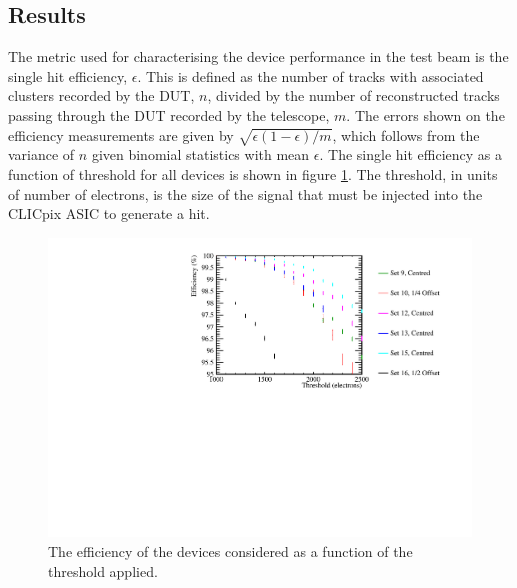 
\subsection{Results}
The metric used for characterising the device performance in the test beam is the single hit efficiency, $\epsilon$.  This is defined as the number of tracks with associated clusters recorded by the DUT, $n$, divided by the number of reconstructed tracks passing through the DUT recorded by the telescope, $m$. The errors shown on the efficiency measurements are given by $\sqrt{\epsilon (1 - \epsilon)/m}$, which follows from the variance of $n$ given binomial statistics with mean $\epsilon$.  The single hit efficiency as a function of threshold for all devices is shown in figure \ref{fig:efficiency}.  The threshold, in units of number of electrons, is the size of the signal that must be injected into the CLICpix ASIC to generate a hit. 

\begin{figure}
\centering
\includegraphics[width=1.0\textwidth]{CLICdpVertex/Plots/TestBeamData/EfficiencyThresholdPlot.pdf}
\caption[The efficiency of the devices considered as a function of the threshold applied.]{The efficiency of the devices considered as a function of the threshold applied.}
\label{fig:efficiency}
\end{figure}

